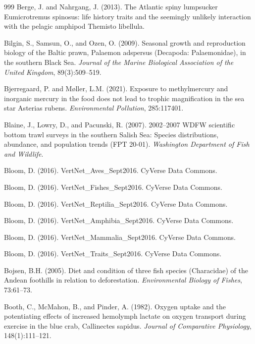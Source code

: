 \begin{thebibliography}{999}
Berge, J. and Nahrgang, J. (2013). The Atlantic spiny lumpsucker Eumicrotremus spinosus: life history traits and the seemingly unlikely interaction with the pelagic amphipod Themisto libellula.

Bilgin, S., Samsun, O., and Ozen, O. (2009). Seasonal growth and reproduction biology of the Baltic prawn, Palaemon adspersus (Decapoda: Palaemonidae), in the southern Black Sea. \textit{Journal of the Marine Biological Association of the United Kingdom}, 89(3):509--519.

Bjerregaard, P. and M{\o}ller, L.M. (2021). Exposure to methylmercury and inorganic mercury in the food does not lead to trophic magnification in the sea star Asterias rubens. \textit{Environmental Pollution}, 285:117401.

Blaine, J., Lowry, D., and Pacunski, R. (2007). 2002--2007 WDFW scientific bottom trawl surveys in the southern Salish Sea: Species distributions, abundance, and population trends (FPT 20-01). \textit{Washington Department of Fish and Wildlife}.

Bloom, D. (2016). VertNet\_Aves\_Sept2016. CyVerse Data Commons.

Bloom, D. (2016). VertNet\_Fishes\_Sept2016. CyVerse Data Commons.

Bloom, D. (2016). VertNet\_Reptilia\_Sept2016. CyVerse Data Commons.

Bloom, D. (2016). VertNet\_Amphibia\_Sept2016. CyVerse Data Commons.

Bloom, D. (2016). VertNet\_Mammalia\_Sept2016. CyVerse Data Commons.

Bloom, D. (2016). VertNet\_Traits\_Sept2016. CyVerse Data Commons.

Bojsen, B.H. (2005). Diet and condition of three fish species (Characidae) of the Andean foothills in relation to deforestation. \textit{Environmental Biology of Fishes}, 73:61--73.

Booth, C., McMahon, B., and Pinder, A. (1982). Oxygen uptake and the potentiating effects of increased hemolymph lactate on oxygen transport during exercise in the blue crab, Callinectes sapidus. \textit{Journal of Comparative Physiology}, 148(1):111--121.


\end{thebibliography}
